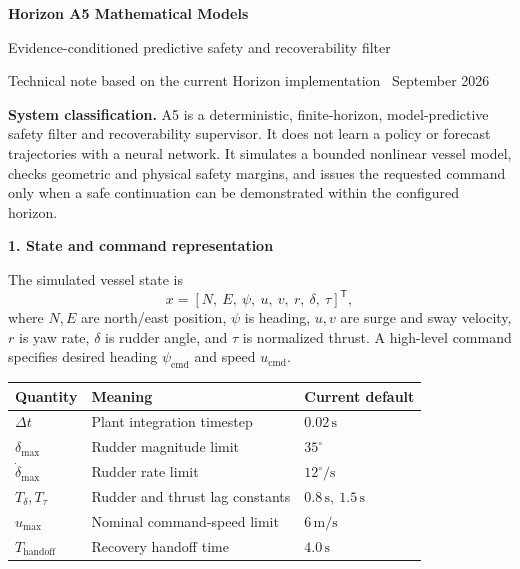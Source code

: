 \documentclass[10pt,a4paper]{article}
\newcommand{\sectionbar}[1]{%
  \vspace{4pt}%
  {\large\bfseries\color{hnavy}#1}\par
  \vspace{-2pt}{\color{hblue}\rule{\textwidth}{0.7pt}}\vspace{2pt}%
}
\newcommand{\modelbox}[1]{%
  \begingroup\setlength{\fboxsep}{8pt}%
  \colorbox{hpale}{\parbox{\dimexpr\textwidth-2\fboxsep\relax}{#1}}%
  \endgroup
}
\begin{document}
\begin{center}
  {\color{hnavy}\fontsize{25}{29}\selectfont\bfseries Horizon A5 Mathematical Models}\par
  \vspace{3pt}
  {\large\color{hgray}Evidence-conditioned predictive safety and recoverability filter}\par
  \vspace{8pt}
  {\small Technical note based on the current Horizon implementation \textbar\ September 2026}
\end{center}

\modelbox{\textbf{System classification.} A5 is a deterministic, finite-horizon, model-predictive safety filter and recoverability supervisor. It does not learn a policy or forecast trajectories with a neural network. It simulates a bounded nonlinear vessel model, checks geometric and physical safety margins, and issues the requested command only when a safe continuation can be demonstrated within the configured horizon.}

\sectionbar{1. State and command representation}

The simulated vessel state is
\begin{equation}
  x = [N,\ E,\ \psi,\ u,\ v,\ r,\ \delta,\ \tau]^{\mathsf T},
\end{equation}
where $N,E$ are north/east position, $\psi$ is heading, $u,v$ are surge and sway velocity, $r$ is yaw rate, $\delta$ is rudder angle, and $\tau$ is normalized thrust. A high-level command specifies desired heading $\psi_{\mathrm{cmd}}$ and speed $u_{\mathrm{cmd}}$.

\begin{table}[h]
\centering
\small
\begin{tabularx}{\textwidth}{@{}lYl@{}}
\toprule
Quantity & Meaning & Current default \\
\midrule
$\Delta t$ & Plant integration timestep & $0.02\,\mathrm{s}$ \\
$\delta_{\max}$ & Rudder magnitude limit & $35^{\circ}$ \\
$\dot\delta_{\max}$ & Rudder rate limit & $12^{\circ}/\mathrm{s}$ \\
$T_\delta, T_\tau$ & Rudder and thrust lag constants & $0.8\,\mathrm{s},\ 1.5\,\mathrm{s}$ \\
$u_{\max}$ & Nominal command-speed limit & $6\,\mathrm{m/s}$ \\
$T_{\mathrm{handoff}}$ & Recovery handoff time & $4.0\,\mathrm{s}$ \\
\bottomrule
\end{tabularx}
\end{table}
\end{document}
